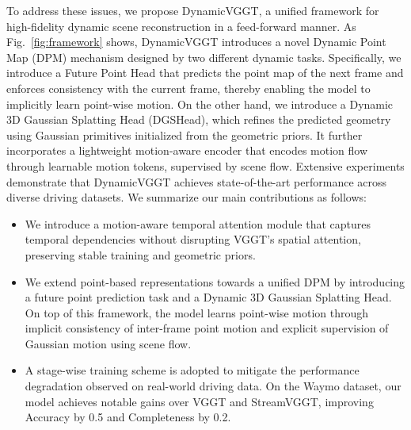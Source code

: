 To address these issues, we propose DynamicVGGT, a unified framework for high-fidelity dynamic scene reconstruction in a feed-forward manner. 
As Fig.~\ref{fig:framework} shows, DynamicVGGT introduces a novel Dynamic Point Map (DPM) \cite{sucar2025dynamic} mechanism designed by two different dynamic tasks.
Specifically, we introduce a Future Point Head that predicts the point map of the next frame and enforces consistency with the current frame, thereby enabling the model to implicitly learn point-wise motion. On the other hand, we introduce a Dynamic 3D Gaussian Splatting Head (DGSHead), which refines the predicted geometry using Gaussian primitives initialized from the geometric priors. 
It further incorporates a lightweight motion-aware encoder that encodes motion flow through learnable motion tokens, supervised by scene flow.
Extensive experiments demonstrate that DynamicVGGT achieves state-of-the-art performance across diverse driving datasets.  We summarize our main contributions as follows:
\begin{itemize}

\item We introduce a motion-aware temporal attention module that captures temporal dependencies without disrupting VGGT’s spatial attention, preserving stable training and geometric priors.

\item We extend point-based representations towards a unified DPM by introducing a future point prediction task and a Dynamic 3D Gaussian Splatting Head.
On top of this framework, the model learns point-wise motion through implicit consistency of inter-frame point motion and explicit supervision of Gaussian motion using scene flow.

\item A stage-wise training scheme is adopted to mitigate the performance degradation observed on real-world driving data.
On the Waymo dataset, our model achieves notable gains over VGGT and StreamVGGT, improving Accuracy by 0.5 and Completeness by 0.2.
\end{itemize}



